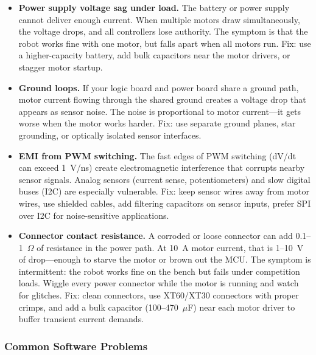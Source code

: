 \begin{itemize}
    \item \textbf{Power supply voltage sag under load.} The battery or power supply cannot deliver enough current. When multiple motors draw simultaneously, the voltage drops, and all controllers lose authority. The symptom is that the robot works fine with one motor, but falls apart when all motors run. Fix: use a higher-capacity battery, add bulk capacitors near the motor drivers, or stagger motor startup.

    \item \textbf{Ground loops.} If your logic board and power board share a ground path, motor current flowing through the shared ground creates a voltage drop that appears as sensor noise. The noise is proportional to motor current---it gets worse when the motor works harder. Fix: use separate ground planes, star grounding, or optically isolated sensor interfaces.

    \item \textbf{EMI from PWM switching.} The fast edges of PWM switching (dV/dt can exceed 1~V/ns) create electromagnetic interference that corrupts nearby sensor signals. Analog sensors (current sense, potentiometers) and slow digital buses (I2C) are especially vulnerable. Fix: keep sensor wires away from motor wires, use shielded cables, add filtering capacitors on sensor inputs, prefer SPI over I2C for noise-sensitive applications.

    \item \textbf{Connector contact resistance.} A corroded or loose connector can add 0.1--1~$\Omega$ of resistance in the power path. At 10~A motor current, that is 1--10~V of drop---enough to starve the motor or brown out the MCU. The symptom is intermittent: the robot works fine on the bench but fails under competition loads. Wiggle every power connector while the motor is running and watch for glitches. Fix: clean connectors, use XT60/XT30 connectors with proper crimps, and add a bulk capacitor (100--470~$\mu$F) near each motor driver to buffer transient current demands.
\end{itemize}

\subsubsection{Common Software Problems}

